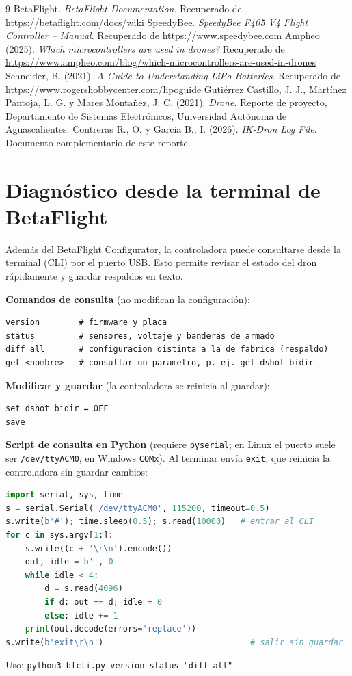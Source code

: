 \documentclass[11pt,letterpaper]{article}
\begin{document}
\begin{thebibliography}{9}
 BetaFlight. \textit{BetaFlight Documentation}. Recuperado de \url{https://betaflight.com/docs/wiki}
 SpeedyBee. \textit{SpeedyBee F405 V4 Flight Controller -- Manual}. Recuperado de \url{https://www.speedybee.com}
 Ampheo (2025). \textit{Which microcontrollers are used in drones?} Recuperado de \url{https://www.ampheo.com/blog/which-microcontrollers-are-used-in-drones}
 Schneider, B. (2021). \textit{A Guide to Understanding LiPo Batteries}. Recuperado de \url{https://www.rogershobbycenter.com/lipoguide}
 Gutiérrez Castillo, J. J., Martínez Pantoja, L. G. y Mares Montañez, J. C. (2021). \textit{Drone}. Reporte de proyecto, Departamento de Sistemas Electrónicos, Universidad Autónoma de Aguascalientes.
 Contreras R., O. y Garcia B., I. (2026). \textit{IK-Dron Log File}. Documento complementario de este reporte.
\end{thebibliography}

\appendix
\section{Diagnóstico desde la terminal de BetaFlight}
\label{anx:cli}
Además del BetaFlight Configurator, la controladora puede consultarse desde la terminal (CLI) por el puerto USB. Esto permite revisar el estado del dron rápidamente y guardar respaldos en texto.

\noindent\textbf{Comandos de consulta} (no modifican la configuración):
\begin{lstlisting}
version        # firmware y placa
status         # sensores, voltaje y banderas de armado
diff all       # configuracion distinta a la de fabrica (respaldo)
get <nombre>   # consultar un parametro, p. ej. get dshot_bidir
\end{lstlisting}

\noindent\textbf{Modificar y guardar} (la controladora se reinicia al guardar):
\begin{lstlisting}
set dshot_bidir = OFF
save
\end{lstlisting}

\noindent\textbf{Script de consulta en Python} (requiere \texttt{pyserial}; en Linux el puerto suele ser \texttt{/dev/ttyACM0}, en Windows \texttt{COMx}). Al terminar envía \texttt{exit}, que reinicia la controladora sin guardar cambios:
\begin{lstlisting}[language=Python]
import serial, sys, time
s = serial.Serial('/dev/ttyACM0', 115200, timeout=0.5)
s.write(b'#'); time.sleep(0.5); s.read(10000)   # entrar al CLI
for c in sys.argv[1:]:
    s.write((c + '\r\n').encode())
    out, idle = b'', 0
    while idle < 4:
        d = s.read(4096)
        if d: out += d; idle = 0
        else: idle += 1
    print(out.decode(errors='replace'))
s.write(b'exit\r\n')                              # salir sin guardar
\end{lstlisting}
Uso: \texttt{python3 bfcli.py version status "diff all"}
\end{document}
